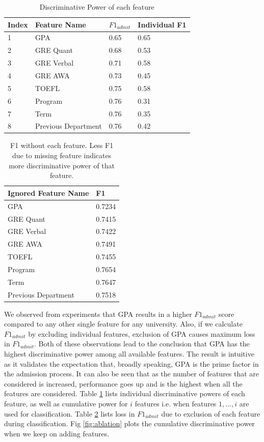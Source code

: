 \documentclass{sig-alternate-05-2015}
\begin{document}
\begin{table}[t]
\centering
\caption{Discriminative Power of each feature}
\label{tab:ablation}
\begin{tabular}{p{0.5 cm} p{2.5 cm} p{1.3 cm} p{1.3 cm}}\\
Index & Feature Name & $F1_{admit}$ & Individual F1 \\ \hline
1 & GPA & 0.65 & 0.65 \\ \hline
2 & GRE Quant & 0.68 & 0.53 \\ \hline
3 & GRE Verbal & 0.71 & 0.58 \\ \hline
4 & GRE AWA & 0.73 & 0.45 \\ \hline
5 & TOEFL & 0.75 & 0.58 \\ \hline
6 & Program & 0.76 & 0.31 \\ \hline
7 & Term & 0.76 & 0.35 \\ \hline
8 & Previous Department & 0.76 & 0.42 \\ \hline
\end{tabular}
\end{table}

\begin{table}[t]
\centering
\caption{F1 without each feature. Less F1 due to missing feature indicates more discriminative power of that feature.}
\label{tab:ablation-2}
\begin{tabular}{p{4.0 cm} p{1.3 cm}} \\
Ignored Feature Name & F1 \\ \hline
GPA & 0.7234 \\ \hline
GRE Quant & 0.7415 \\ \hline
GRE Verbal & 0.7422 \\ \hline
GRE AWA & 0.7491 \\ \hline
TOEFL & 0.7455 \\ \hline
Program & 0.7654 \\ \hline
Term & 0.7647 \\ \hline
Previous Department & 0.7518 \\ \hline
\end{tabular}
\end{table}

We observed from experiments that GPA results in a higher $F1_{admit}$ score compared to any other single feature for any university. Also, if we calculate $F1_{admit}$ by excluding individual features, exclusion of GPA causes maximum loss in $F1_{admit}$. Both of these observations lead to the conclusion that GPA has the highest discriminative power among all available features. The result is intuitive as it validates the expectation that, broadly speaking, GPA is the prime factor in the admission process. It can also be seen that as the number of features that are considered is increased, performance goes up and is the highest when all the features are considered. Table \ref{tab:ablation} lists individual discriminative powers of each feature, as well as cumulative power for $i$ features i.e. when features ${1,...,i}$ are used for classification. Table \ref{tab:ablation-2} lists loss in $F1_{admit}$ due to exclusion of each feature during classification. Fig \ref{fig:ablation} plots the cumulative discriminative power when we keep on adding features.
\end{document}
